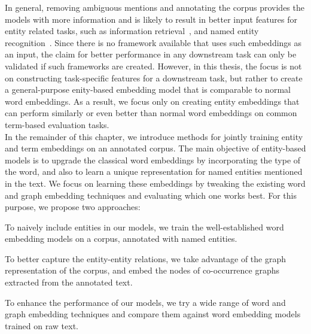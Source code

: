 In general, removing ambiguous mentions and annotating the corpus provides the models with more information and is likely to result in better input features for entity related tasks, such as information retrieval~, and named entity recognition~.
Since there is no framework available that uses such embeddings as an input, the claim for better performance in any downstream task can only be validated if such frameworks are created. However, in this thesis, the focus is not on constructing task-specific features for a downstream task, but rather to create a general-purpose enity-based embedding model that is comparable to normal word embeddings. As a result, we focus only on creating entity embeddings that can perform similarly or even better than normal word embeddings on common term-based evaluation tasks.\\
In the remainder of this chapter, we introduce methods for jointly training entity and term embeddings on an annotated corpus. The main objective of entity-based models is to upgrade the classical word embeddings by incorporating the type of the word, and also to learn a unique representation for named entities mentioned in the text. We focus on learning these embeddings by tweaking the existing word and graph embedding techniques and evaluating which one works best. For this purpose, we propose two approaches: 
\begin{compactenum}
\item To naively include entities in our models, we train the well-established word embedding models on a corpus, annotated with named entities. 
\item To better capture the entity-entity relations, we take advantage of the graph representation of the corpus, and embed the nodes of co-occurrence graphs extracted from the annotated text. 
\end{compactenum}
To enhance the performance of our models, we try a wide range of word and graph embedding  techniques and compare them against word embedding models trained on raw text.

